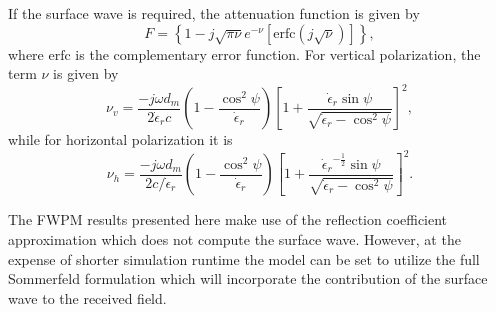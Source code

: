 \documentclass[10pt,journal,twoside]{IEEEtran}
\begin{document}
If the surface wave is required, the attenuation function is given by 
\begin{equation}
\label{eq:F}
F = \left\{ 1 - j\sqrt{\pi\nu}e^{-\nu} \left[ \text{erfc}\left(j\sqrt{\nu}\right) \right] \right\},
\end{equation}
where $\text{erfc}$ is the complementary error function. For vertical polarization, the term $\nu$ is given by
\begin{equation}
\label{eq:atten_arg_v}
\nu_v = \dfrac{ -j\omega d_m  }{2\dot\epsilon_rc} \left(1 - \dfrac{\cos^2\psi}{\dot\epsilon_r}\right)
\left[ 1 + \dfrac{\dot\epsilon_r\sin\psi} {\sqrt{ \dot\epsilon_r - \cos^2\psi } } \right]^2,
\end{equation}
while for horizontal polarization it is
\begin{equation}
\label{eq:atten_arg_h}
\nu_h = \dfrac{ -j\omega d_m  }{2c/\dot\epsilon_r} \left(1 - \dfrac{\cos^2\psi}{\dot\epsilon_r}\right)
\left[ 1 + \dfrac{ {\dot\epsilon_r}^{-\frac{1}{2}}\sin\psi } { \sqrt{ \dot\epsilon_r - \cos^2\psi } } \right]^2.
\end{equation}

The FWPM results presented here make use of the reflection coefficient approximation which does not compute the surface wave. However, at the expense of shorter simulation runtime the model can be set to utilize the full Sommerfeld formulation which will incorporate the contribution of the surface wave to the received field. %
%
\end{document}
